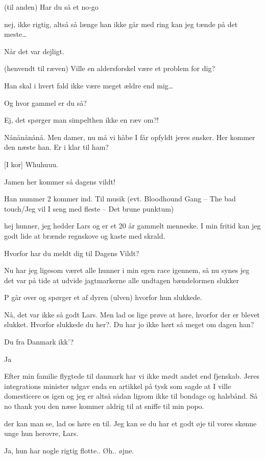 \documentclass[a4paper,11pt]{article}
\begin{document}
\begin{sketch}
 (til anden) Har du så et no-go

 nej, ikke rigtig, altså så længe han ikke går med ring kan jeg tænde på det meste… 

 Når det var dejligt.

(henvendt til ræven) Ville en aldersforskel være et problem for dig? 

 Han skal i hvert fald ikke være meget ældre end mig… 

 Og hvor gammel er du så?

 Ej, det spørger man simpelthen ikke en ræv om?!

 Nånånånånå. Men damer, nu må vi håbe I får opfyldt jeres ønsker. Her kommer den næste han. Er i klar til ham? 

[I kor] Whuhuuu.

 Jamen her kommer så dagens vildt!

\scene Han nummer 2 kommer ind. Til musik (evt. Bloodhound Gang – The bad touch/Jeg vil I seng med fleste – Det brune punktum)

 hej hunner, jeg hedder Lars og er et 20 år gammelt menneske. I min fritid kan jeg godt lide at brænde regnskove og kaste med skrald.

 Hvorfor har du meldt dig til Dagens Vildt?

 Nu har jeg ligesom været alle hunner i min egen race igennem, så nu synes jeg det var på tide at udvide jagtmarkerne alle undtagen bændelormen slukker

\scene P går over og spørger et af dyren (ulven) hvorfor hun slukkede.

 Nå, det var ikke så godt Lars. Men lad os lige prøve at høre, hvorfor der er blevet slukket. Hvorfor slukkede du her?. Du har jo ikke hørt så meget om dagen han?

 Du fra Danmark ikk'?

 Ja

 Efter min familie flygtede til danmark har vi ikke mødt andet end fjenskab. Jeres integrations minister udgav enda en artikkel på tysk som sagde at I ville domesticere os igen og jeg er altså sådan ligsom ikke til bondage og halsbånd. Så no thank you den næse kommer aldrig til at sniffe til min popo.

 der kan man se, lad os høre en til. Jeg kan se du har et godt øje til vores skønne unge hun herovre, Lars.

 Ja, hun har nogle rigtig flotte.. Øh.. øjne. 


\end{sketch}
\end{document}
